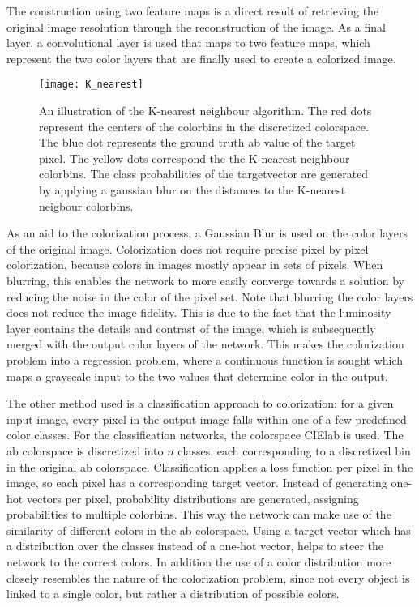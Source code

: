 The construction using two feature maps is a direct result of retrieving the original image resolution through the reconstruction of the image. As a final layer, a convolutional layer is used that maps to two feature maps, which represent the two color layers that are finally used to create a colorized image.

\begin{wrapfigure}{R}{0.5\textwidth}
	\vspace{-20pt}
	\begin{center}
		\texttt{[image: K\_nearest]}
	\end{center}
	\caption{An illustration of the K-nearest neighbour algorithm. The red dots represent the centers of the colorbins in the discretized colorspace. The blue dot represents the ground truth ab value of the target pixel. The yellow dots correspond the the K-nearest neighbour colorbins. The class probabilities of the targetvector are generated by applying a gaussian blur on the distances to the K-nearest neigbour colorbins.}
	\vspace{0pt}
	\label{fig:k_nearest}
\end{wrapfigure}

As an aid to the colorization process, a Gaussian Blur is used on the color layers of the original image. Colorization does not require precise pixel by pixel colorization, because colors in images mostly appear in sets of pixels. When blurring, this enables the network to more easily converge towards a solution by reducing the noise in the color of the pixel set. Note that blurring the color layers does not reduce the image fidelity. This is due to the fact that the luminosity layer contains the details and contrast of the image, which is subsequently merged with the output color layers of the network. This makes the colorization problem into a regression problem, where a continuous function is sought which maps a grayscale input to the two values that determine color in the output.

The other method used is a classification approach to colorization: for a given input image, every pixel in the output image falls within one of a few predefined color classes. For the classification networks, the colorspace CIElab is used. The ab colorspace is discretized into $n$ classes, each corresponding to a discretized bin in the original ab colorspace. Classification applies a loss function per pixel in the image, so each pixel has a corresponding target vector. Instead of generating one-hot vectors per pixel, probability distributions are generated, assigning probabilities to multiple colorbins. This way the network can make use of the similarity of different colors in the ab colorspace. Using a target vector which has a distribution over the classes instead of a one-hot vector, helps to steer the network to the correct colors. In addition the use of a color distribution more closely resembles the nature of the colorization problem, since not every object is linked to a single color, but rather a distribution of possible colors. 

